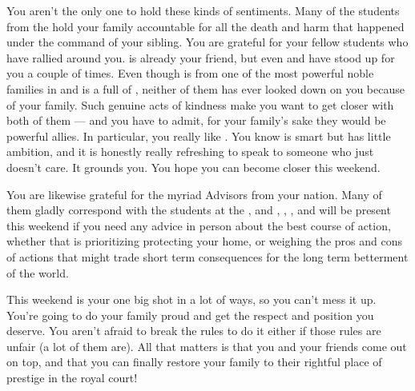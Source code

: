 \documentclass[char]{GL2020}
\begin{document}
You aren’t the only one to hold these kinds of sentiments. Many of the students from the \pShip{} hold your family accountable for all the death and harm that happened under the command of your sibling. You are grateful for your fellow \pFarm{} students who have rallied around you. \cAdopted{} is already your friend, but even \cChupStudent{\full} and \cDisney{\full} have stood up for you a couple of times. Even though \cChupStudent{} is from one of the most powerful noble families in \pFarm{} and \cDisney{} is a full \cDisney{\Cleric} of \cFarmGod{}, neither of them has ever looked down on you because of your family. Such genuine acts of kindness make you want to get closer with both of them — and you have to admit, for your family’s sake they would be powerful allies. In particular, you really like \cChupStudent{}. You know \cChupStudent{} is smart but has little ambition, and it is honestly really refreshing to speak to someone who just doesn’t care. It grounds you. You hope you can become closer this weekend. 

You are likewise grateful for the myriad Advisors from your nation. Many of them gladly correspond with the students at the \pSchool{}, and \cEvil{\full}, \cWildCard{\full}, \cHedonist{\full}, and \cCurse{\full} will be present this weekend if you need any advice in person about the best course of action, whether that is prioritizing protecting your home, or weighing the pros and cons of actions that might trade short term consequences for the long term betterment of the world.

This weekend is your one big shot in a lot of ways, so you can't mess it up. You're going to do your family proud and get the respect and position you deserve. You aren't afraid to break the rules to do it either if those rules are unfair (a lot of them are). All that matters is that you and your friends come out on top, and that you can finally restore your family to their rightful place of prestige in the royal court! 
\end{document}
